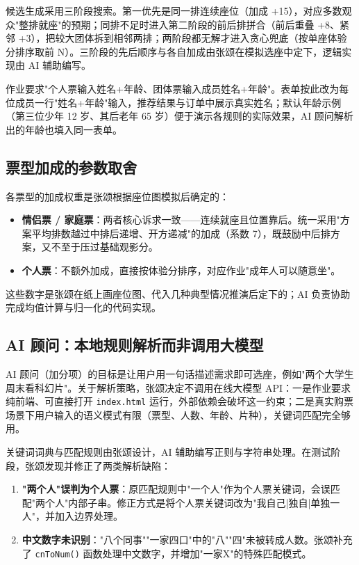 \documentclass[12pt,a4paper]{ctexart}
\begin{document}
候选生成采用三阶段搜索。第一优先是同一排连续座位（加成 +15），对应多数观众"整排就座"的预期；同排不足时进入第二阶段的前后排拼合（前后重叠 +8、紧邻 +3），把较大团体拆到相邻两排；两阶段都无解才进入贪心兜底（按单座体验分排序取前 N）。三阶段的先后顺序与各自加成由张颂在模拟选座中定下，逻辑实现由 AI 辅助编写。

作业要求"个人票输入姓名+年龄、团体票输入成员姓名+年龄"。表单按此改为每位成员一行"姓名+年龄"输入，推荐结果与订单中展示真实姓名；默认年龄示例（第三位少年 12 岁、其后老年 65 岁）便于演示各规则的实际效果，AI 顾问解析出的年龄也填入同一表单。

\subsection{票型加成的参数取舍}

各票型的加成权重是张颂根据座位图模拟后确定的：

\begin{itemize}
  \item \textbf{情侣票 / 家庭票}：两者核心诉求一致——连续就座且位置靠后。统一采用"方案平均排数越过中排后递增、开方递减"的加成（系数 7），既鼓励中后排方案，又不至于压过基础观影分。
  \item \textbf{个人票}：不额外加成，直接按体验分排序，对应作业"成年人可以随意坐"。
\end{itemize}

这些数字是张颂在纸上画座位图、代入几种典型情况推演后定下的；AI 负责协助完成均值计算与归一化的代码实现。

\subsection{AI 顾问：本地规则解析而非调用大模型}

AI 顾问（加分项）的目标是让用户用一句话描述需求即可选座，例如"两个大学生周末看科幻片"。关于解析策略，张颂决定不调用在线大模型 API：一是作业要求纯前端、可直接打开 \texttt{index.html} 运行，外部依赖会破坏这一约束；二是真实购票场景下用户输入的语义模式有限（票型、人数、年龄、片种），关键词匹配完全够用。

关键词词典与匹配规则由张颂设计，AI 辅助编写正则与字符串处理。在测试阶段，张颂发现并修正了两类解析缺陷：

\begin{enumerate}
  \item \textbf{"两个人"误判为个人票}：原匹配规则中"一个人"作为个人票关键词，会误匹配"两个人"内部子串。修正方式是将个人票关键词改为"我自己|独自|单独一人"，并加入边界处理。
  \item \textbf{中文数字未识别}："八个同事""一家四口"中的"八""四"未被转成人数。张颂补充了 \texttt{cnToNum()} 函数处理中文数字，并增加"一家X"的特殊匹配模式。
\end{enumerate}
\end{document}
